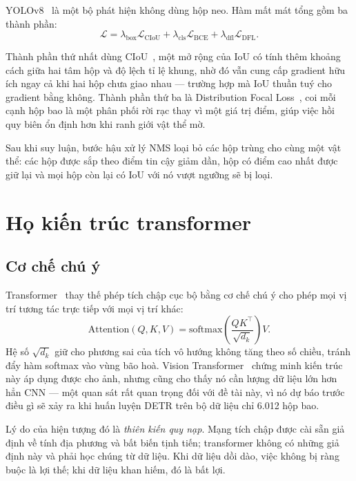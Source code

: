 YOLOv8~\cite{jocher2023ultralytics} là một bộ phát hiện không dùng hộp neo. Hàm mất mát tổng gồm
ba thành phần:
\begin{equation}
\label{eq:yololoss}
\mathcal{L} = \lambda_{\text{box}} \mathcal{L}_{\text{CIoU}}
            + \lambda_{\text{cls}} \mathcal{L}_{\text{BCE}}
            + \lambda_{\text{dfl}} \mathcal{L}_{\text{DFL}}.
\end{equation}

Thành phần thứ nhất dùng CIoU~\cite{zheng2020diou}, một mở rộng của IoU có tính thêm khoảng cách
giữa hai tâm hộp và độ lệch tỉ lệ khung, nhờ đó vẫn cung cấp gradient hữu ích ngay cả khi hai hộp
chưa giao nhau --- trường hợp mà IoU thuần tuý cho gradient bằng không. Thành phần thứ ba là
Distribution Focal Loss~\cite{li2020gfl}, coi mỗi cạnh hộp bao là một phân phối rời rạc thay vì
một giá trị điểm, giúp việc hồi quy biên ổn định hơn khi ranh giới vật thể mờ.

Sau khi suy luận, bước hậu xử lý NMS loại bỏ các hộp trùng cho cùng một vật thể: các hộp được sắp
theo điểm tin cậy giảm dần, hộp có điểm cao nhất được giữ lại và mọi hộp còn lại có IoU với nó
vượt ngưỡng sẽ bị loại.

\section{Họ kiến trúc transformer}

\subsection{Cơ chế chú ý}

Transformer~\cite{vaswani2017attention} thay thế phép tích chập cục bộ bằng cơ chế chú ý cho phép
mọi vị trí tương tác trực tiếp với mọi vị trí khác:
\begin{equation}
\label{eq:attention}
\text{Attention}(Q, K, V) = \text{softmax}\!\left(\frac{QK^{\top}}{\sqrt{d_k}}\right) V .
\end{equation}
Hệ số $\sqrt{d_k}$ giữ cho phương sai của tích vô hướng không tăng theo số chiều, tránh đẩy hàm
softmax vào vùng bão hoà. Vision Transformer~\cite{dosovitskiy2021vit} chứng minh kiến trúc này áp
dụng được cho ảnh, nhưng cũng cho thấy nó cần lượng dữ liệu lớn hơn hẳn CNN --- một quan sát rất
quan trọng đối với đề tài này, vì nó dự báo trước điều gì sẽ xảy ra khi huấn luyện DETR trên bộ dữ
liệu chỉ 6.012 hộp bao.

Lý do của hiện tượng đó là \emph{thiên kiến quy nạp}. Mạng tích chập được cài sẵn giả định về tính
địa phương và bất biến tịnh tiến; transformer không có những giả định này và phải học chúng từ dữ
liệu. Khi dữ liệu dồi dào, việc không bị ràng buộc là lợi thế; khi dữ liệu khan hiếm, đó là bất
lợi.

